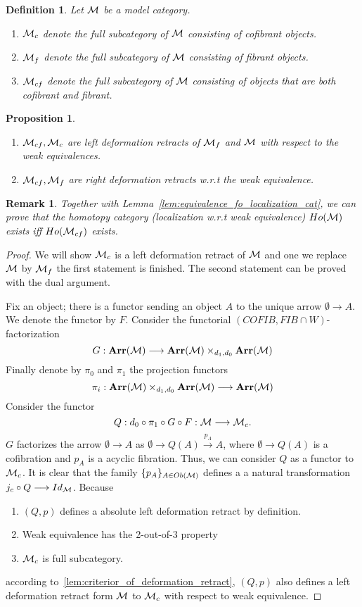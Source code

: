 \documentclass[11pt]{article}
\newtheorem{prop}[thm]{Proposition}
\newtheorem{dfn}[thm]{Definition}
\newtheorem{rmk}[thm]{Remark}
\newcommand{\calm}{{\cal M}}
\newcommand{\lrta}{\longrightarrow}
\begin{document}
\begin{dfn}
Let $\calm$ be a model category. 
\begin{enumerate}
\item $\calm_c$ denote the full subcategory of $\calm$ consisting of cofibrant objects.
\item $\calm_f$ denote the full  subcategory of $\calm$ consisting of fibrant objects.
\item $\calm_{cf}$ denote the full subcategory of $\calm$ consisting of objects that are both cofibrant and fibrant.
\end{enumerate}
\end{dfn}
\begin{prop}
\begin{enumerate}
  \item $\calm_{cf},\calm_c$ are left deformation retracts of $\calm_f$ and $\calm$ with respect to the weak equivalences.
  \item $\calm_{cf},\calm_{f}$ are right deformation retracts w.r.t the weak equivalence.
\end{enumerate}
\end{prop}
\begin{rmk}
Together with Lemma~\ref{lem:equivalence_fo_localization_cat},  we can prove that the homotopy category (localization w.r.t weak equivalence) $Ho(\calm)$ exists iff $Ho(\calm_{cf})$ exists.
\end{rmk}
\begin{proof}
 We will show $\calm_c$ is a left deformation retract of $\calm$ and one we replace $\calm$ by $\calm_f$ the first statement is finished. The second statement can be proved with the dual argument.

 Fix an object; there is a functor sending an object $A$ to the unique arrow $\emptyset\lrta A$. We denote the functor by $F$. Consider the functorial $(COFIB,FIB\cap W)$-factorization
 $$
G:\mathbf{Arr}(\calm)\lrta \mathbf{Arr}(\calm)\times_{d_1,d_0}\mathbf{Arr}(\calm)
 $$ 
 Finally denote by $\pi_0$ and $\pi_1$ the projection functors
 $$
 \pi_i:\mathbf{Arr}(\calm)\times_{d_1,d_0}\mathbf{Arr}(\calm)\lrta \mathbf{Arr}(\calm)
 $$
 Consider the functor
 $$
Q:d_0\circ \pi_1\circ G\circ F:\calm\lrta \calm_c.
 $$
 $G$ factorizes the arrow $\emptyset\lrta A$ as $\emptyset \lrta Q(A)\overset{p_A}{\lrta} A$, where $\emptyset\lrta Q(A)$ is a cofibration and $p_A$ is a acyclic fibration. Thus, we can consider $Q$ as  a functor to $\calm_c$. It is clear that the family $\{p_A\}_{A\in Ob(\calm)}$ defines a a natural transformation $j_c\circ Q\lrta Id_\calm$. Because
\begin{enumerate}
\item $(Q,p)$ defines a absolute left deformation retract by definition.
\item Weak equivalence has the 2-out-of-3 property
\item $\calm_c$ is full subcategory.
\end{enumerate}
according to~\ref{lem:criterior_of_deformation_retract}, $(Q,p)$ also defines a left deformation retract form $\calm$ to $\calm_c$ with respect to weak equivalence.
\end{proof}
\end{document}
